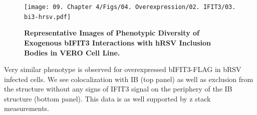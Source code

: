 \begin{figure}
    \centering
    \texttt{[image: 09. Chapter 4/Figs/04. Overexpression/02. IFIT3/03. bi3-hrsv.pdf]}
    \caption[Representative Images of Phenotypic Diversity of Exogenous bIFIT3 Interactions with hRSV Inclusion Bodies in VERO Cell Line.]{\textbf{Representative Images of Phenotypic Diversity of Exogenous bIFIT3 Interactions with hRSV Inclusion Bodies in VERO Cell Line.} }
    \label{fig:Representative Images of Phenotypic Diversity of Exogenous bIFIT3 Interactions with hRSV Inclusion Bodies in VERO Cell Line}
\end{figure}

Very similar phenotype is observed for overexpressed bIFIT3-FLAG in bRSV infected cells. We see colocalization with IB (top panel) as well as exclusion from the structure without any signs of IFIT3 signal on the periphery of the IB structure (bottom panel). This data is as well supported by z stack measurements.

